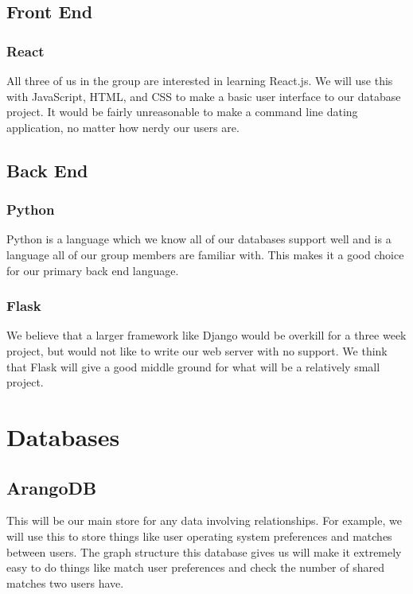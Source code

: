 \documentclass[11pt]{article}
\begin{document}
\subsection{Front End}
\label{sec:orgd1539c8}
\subsubsection{React}
\label{sec:org07000eb}
All three of us in the group are interested in learning React.js. We will
use this with JavaScript, HTML, and CSS to make a basic user interface to
our database project. It would be fairly unreasonable to make a command line
dating application, no matter how nerdy our users are.

\subsection{Back End}
\label{sec:org280a44a}
\subsubsection{Python}
\label{sec:org8e29c84}
Python is a language which we know all of our databases support well and is
a language all of our group members are familiar with. This makes it a good
choice for our primary back end language.

\subsubsection{Flask}
\label{sec:orgf19f034}
We believe that a larger framework like Django would be overkill for a three
week project, but would not like to write our web server with no support. We
think that Flask will give a good middle ground for what will be a
relatively small project.

\section{Databases}
\label{sec:org9f33ca5}
\subsection{ArangoDB}
\label{sec:org69a850b}
This will be our main store for any data involving relationships. For
example, we will use this to store things like user operating system
preferences and matches between users. The graph structure this database
gives us will make it extremely easy to do things like match user preferences
and check the number of shared matches two users have.
\end{document}
